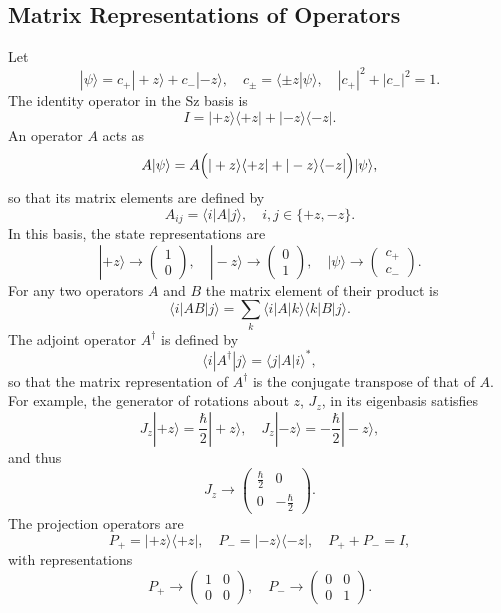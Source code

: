 \documentclass[twocolumn]{article}
\begin{document}
\begin{spacing}{1}
  \subsection{Matrix Representations of Operators}
  Let 
  \[
  |\psi\rangle = c_{+}|+z\rangle + c_{-}|-z\rangle,\quad c_{\pm} = \langle\pm z|\psi\rangle,\quad |c_{+}|^2+|c_{-}|^2=1.
  \]
  The identity operator in the Sz basis is
  \[
  I = |+z\rangle\langle+z| + |-z\rangle\langle-z|.
  \]
  An operator \(A\) acts as
  \[
  A|\psi\rangle = A\Bigl(|+z\rangle\langle+z|+|-z\rangle\langle-z|\Bigr)|\psi\rangle,
  \]
  so that its matrix elements are defined by
  \[
  A_{ij} = \langle i|A|j\rangle,\quad i,j\in\{+z,-z\}.
  \]
  In this basis, the state representations are
  \[
  |+z\rangle \rightarrow \begin{pmatrix}1\\0\end{pmatrix},\quad |-z\rangle \rightarrow \begin{pmatrix}0\\1\end{pmatrix},\quad |\psi\rangle \rightarrow \begin{pmatrix}c_{+}\\ c_{-}\end{pmatrix}.
  \]
  For any two operators \(A\) and \(B\) the matrix element of their product is
  \[
  \langle i|AB|j\rangle = \sum_{k}\langle i|A|k\rangle\langle k|B|j\rangle.
  \]
  The adjoint operator \(A^{\dagger}\) is defined by
  \[
  \langle i|A^{\dagger}|j\rangle = \langle j|A|i\rangle^*,
  \]
  so that the matrix representation of \(A^{\dagger}\) is the conjugate transpose of that of \(A\).  
  For example, the generator of rotations about \(z\), \(J_z\), in its eigenbasis satisfies
  \[
  J_z|+z\rangle=\frac{\hbar}{2}|+z\rangle,\quad J_z|-z\rangle=-\frac{\hbar}{2}|-z\rangle,
  \]
  and thus
  \[
  J_z \rightarrow \begin{pmatrix}\frac{\hbar}{2}&0\\0&-\frac{\hbar}{2}\end{pmatrix}.
  \]
  The projection operators are
  \[
  P_{+} = |+z\rangle\langle+z|,\quad P_{-} = |-z\rangle\langle-z|,\quad P_{+}+P_{-}=I,
  \]
  with representations
  \[
  P_{+}\rightarrow\begin{pmatrix}1&0\\0&0\end{pmatrix},\quad P_{-}\rightarrow\begin{pmatrix}0&0\\0&1\end{pmatrix}.
  \]
  

\end{spacing}
\end{document}
